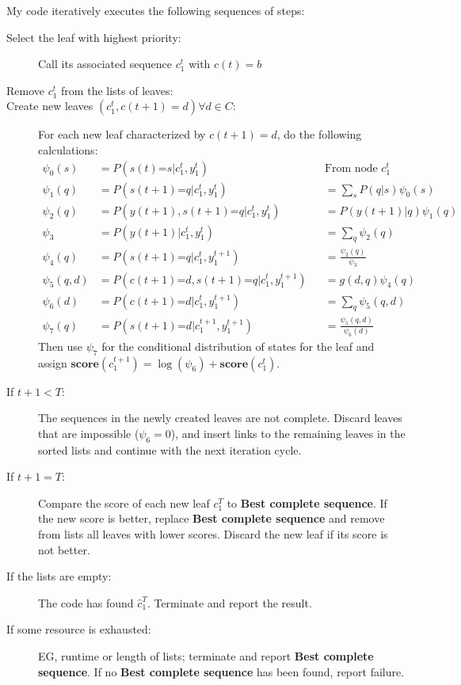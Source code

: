 \documentclass[]{article}
\newcommand{\ts}[3]{#1_{#2}^{#3}}                    %
\newcommand{\ti}[2]{{#1}{(#2)}}                  %
\newcommand{\is}{\texttt{=}}
\begin{document}
My code iteratively executes the following sequences of steps:
\begin{description}
\item[Select the leaf with highest priority:] Call its associated sequence
  $\ts{c}{1}{t}$ with $\ti{c}{t} = b$
\item[Remove $\ts{c}{1}{t}$ from the lists of leaves:]
\item[Create new leaves $\left( \ts{c}{1}{t}, \ti{c}{t+1} = d \right)
  \forall d \in C$:] For each new leaf characterized by $\ti{c}{t+1} =
  d$, do the following calculations:
  \begin{align*}
    \psi_0(s) &= P\left(\ti{s}{t}\is s|\ts{c}{1}{t}, \ts{y}{1}{t}\right)
    && \text{From node }\ts{c}{1}{t} \\
    \psi_1(q) &= P\left(\ti{s}{t+1}\is q|\ts{c}{1}{t},
                \ts{y}{1}{t}\right) &&= \sum_s P(q|s) \psi_0(s) \\
    \psi_2(q) &=  P\left(\ti{y}{t+1}, \ti{s}{t+1}\is q|\ts{c}{1}{t},
                \ts{y}{1}{t}\right) &&= P(\ti{y}{t+1}|q) \psi_1(q) \\
    \psi_3 &= P\left(\ti{y}{t+1}|\ts{c}{1}{t},
             \ts{y}{1}{t}\right) &&= \sum_q \psi_2(q) \\
    \psi_4(q) &= P\left(\ti{s}{t+1}\is q|\ts{c}{1}{t},
                \ts{y}{1}{t+1}\right) &&= \frac{\psi_2(q)}{\psi_3} \\
    \psi_5(q,d) &= P\left(\ti{c}{t+1}\is d, \ti{s}{t+1}\is q|\ts{c}{1}{t},
                  \ts{y}{1}{t+1}\right) &&= g(d,q) \psi_4(q) \\
    \psi_6(d) &= P\left(\ti{c}{t+1}\is d|\ts{c}{1}{t},
                \ts{y}{1}{t+1}\right) &&= \sum_q \psi_5(q,d) \\
    \psi_7(q) &= P\left(\ti{s}{t+1}\is d|\ts{c}{1}{t+1},
                \ts{y}{1}{t+1}\right) &&= \frac{\psi_5(q,d)}{\psi_6(d)}
  \end{align*}
  Then use $\psi_7$ for the conditional distribution of states for the
  leaf and assign
  $\mathbf{score}\left(\ts{c}{1}{t+1}\right) = \log(\psi_6) +
  \mathbf{score}\left( \ts{c}{1}{t} \right)$.
\item[If $t+1 < T$:] The sequences in the newly created leaves are not
  complete.  Discard leaves that are impossible ($\psi_6 = 0$), and
  insert links to the remaining leaves in the sorted lists and
  continue with the next iteration cycle.
\item[If $t+1 = T$:] Compare the score of each new leaf $\ts{c}{1}{T}$
  to \textbf{Best complete sequence}.  If the new score is better,
  replace \textbf{Best complete sequence} and remove from lists all
  leaves with lower scores.  Discard the new leaf if its score is not
  better.
\item[If the lists are empty:] The code has found
  $\ts{\hat{c}}{1}{T}$.  Terminate and report the result.
\item[If some resource is exhausted:] EG, runtime or length of lists;
  terminate and report \textbf{Best complete sequence}.  If no
  \textbf{Best complete sequence} has been found, report failure.
\end{description}
\end{document}
